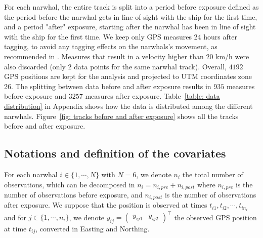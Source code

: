 \documentclass[11pt]{article}
\newcommand {\1}{\mathbb{1}}
\begin{document}
For each narwhal, the entire track is split into a period before exposure defined as the period before the narwhal gets in line of sight with the ship for the first time, and a period "after" exposure, starting after the narwhal has been in line of sight with the ship for the first time. We keep only GPS measures 24 
hours after tagging, to avoid any tagging effects on the narwhals's movement, as recommended in \cite{heide-jorgensen_behavioral_2021}.
Measures that result in a velocity higher than $20$ km/h were also discarded (only 2 data points for the same narwhal track).
Overall, $4192$ GPS positions are kept for the analysis and projected to UTM coordinates zone 26. The splitting between data before and after exposure results in $935$ measures before exposure and $3257$ measures after exposure. Table~\ref{table: data distribution} in Appendix shows how the data is distributed among the different narwhals. Figure~\ref{fig: tracks before and after exposure} shows all the tracks before and after exposure.


\subsection{Notations and definition of the covariates}


For each narwhal $i \in \{1,\cdots,N\}$ with $N=6$, we denote $n_i$ the total number of observations, which can be decomposed in $n_i=n_{i,pre}+n_{i,post}$ where $n_{i,pre}$ is the number of observations before exposure, and $n_{i,post}$ is the number of observations after exposure. We suppose that the position is observed at times $t_{i1}, t_{i2}, \cdots,t_{in_i}$ and  for $j \in \{1,\cdots,n_i\}$, we denote $y_{ij}=\begin{pmatrix} y_{ij1} & y_{ij2} \end{pmatrix}^\top$ the observed GPS position at time $t_{ij}$, converted in Easting and Northing.
\end{document}
